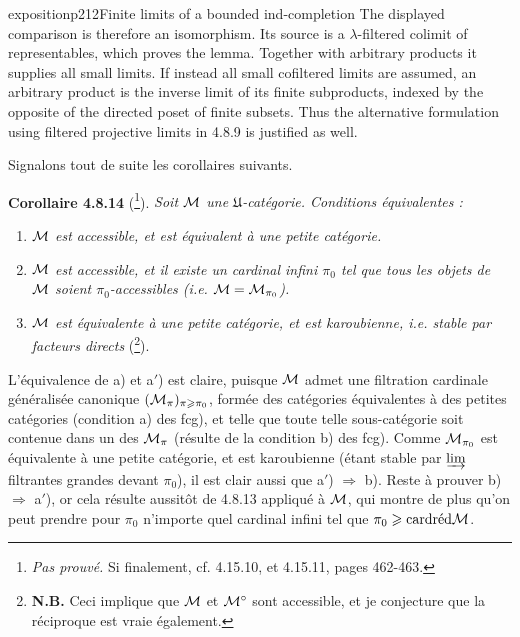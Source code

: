 \begin{dcomment}{exposition}{p212}{Finite limits of a bounded ind-completion}
The displayed comparison is therefore an isomorphism. Its source is a $\lambda$-filtered colimit of representables, which proves the lemma. Together with arbitrary products it supplies all small limits. If instead all small cofiltered limits are assumed, an arbitrary product is the inverse limit of its finite subproducts, indexed by the opposite of the directed poset of finite subsets. Thus the alternative formulation using filtered projective limits in 4.8.9 is justified as well.
\end{dcomment}


Signalons tout de suite les corollaires suivants.

\textbf{Corollaire 4.8.14} (\footnote[90]{\textit{Pas prouvé.} Si finalement, cf. 4.15.10, et 4.15.11, pages 462-463.}). \textit{Soit $\cM$ une $\mathfrak{U}$-catégorie. Conditions équivalentes :}
\begin{enumerate}[leftmargin=*]
\item[\textit{a)}] \textit{$\cM$ est accessible, et est équivalent à une petite catégorie.}
\item[\textit{a$'$)}] \textit{$\cM$ est accessible, et il existe un cardinal infini $\pi_0$ tel que tous les objets de $\cM$ soient $\pi_0$-accessibles (i.e. $\cM = \cM_{\pi_0}$).}
\item[\textit{b)}] \textit{$\cM$ est équivalente à une petite catégorie, et est karoubienne, i.e. stable par facteurs directs} (\footnote[91]{\textbf{N.B.} Ceci implique que $\cM$ et $\cM^{\circ}$ sont accessible, et je conjecture que la réciproque est vraie également.}). %
\end{enumerate}

L'équivalence de a) et a$'$) est claire, puisque $\cM$ admet une filtration cardinale généralisée canonique $(\cM_{\pi})_{\pi\geqslant\pi_0}$, formée des catégories équivalentes à des petites catégories (condition
a) des fcg), et telle que toute telle sous-catégorie soit contenue dans un des $\cM_{\pi}$ (résulte de la condition b) des fcg). Comme $\cM_{\pi_0}$ est équivalente à une petite catégorie, et est karoubienne (étant stable par $\varinjlim$ filtrantes grandes devant $\pi_0$), il est clair aussi que a$'$) $\Longrightarrow$ b). Reste à prouver b) $\Longrightarrow$ a$'$), or cela résulte aussitôt de 4.8.13 appliqué à $\cM$, qui montre de plus qu'on peut prendre pour $\pi_0$ n'importe quel cardinal infini tel que $\pi_0 \geqslant \card\red\cM$.

